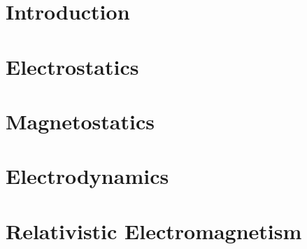 \documentclass[british,11pt,a4paper]{report}
\begin{document}
\maketitle
\tableofcontents

\chapter{Introduction}

\chapter{Electrostatics}

\chapter{Magnetostatics}

\chapter{Electrodynamics}

\chapter{Relativistic Electromagnetism}
%
\end{document}
